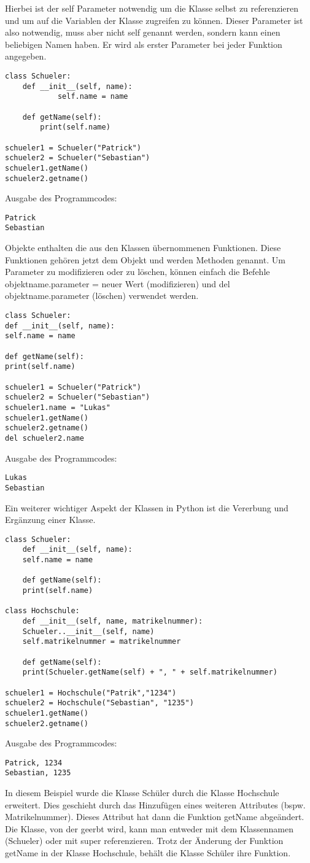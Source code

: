 Hierbei ist der self Parameter notwendig um die Klasse selbst zu referenzieren und um auf die Variablen der Klasse zugreifen zu k{\"o}nnen. Dieser Parameter ist also notwendig, muss aber nicht self genannt werden, sondern kann einen beliebigen Namen haben. Er wird als erster Parameter bei jeder Funktion angegeben.
\begin{lstlisting}
class Schueler:
	def __init__(self, name):
			self.name = name
	
	def getName(self):
		print(self.name)

schueler1 = Schueler("Patrick")
schueler2 = Schueler("Sebastian")
schueler1.getName()
schueler2.getname()
\end{lstlisting}
Ausgabe des Programmcodes: 
\begin{lstlisting}
Patrick
Sebastian
\end{lstlisting}
Objekte enthalten die aus den Klassen {\"u}bernommenen Funktionen. Diese Funktionen geh{\"o}ren jetzt dem Objekt und werden Methoden genannt.
Um Parameter zu modifizieren oder zu l{\"o}schen, k{\"o}nnen einfach die Befehle        objektname.parameter = neuer Wert (modifizieren) und del objektname.parameter (l{\"o}schen) verwendet werden.
\begin{lstlisting}
class Schueler:
def __init__(self, name):
self.name = name

def getName(self):
print(self.name)

schueler1 = Schueler("Patrick")
schueler2 = Schueler("Sebastian")
schueler1.name = "Lukas"
schueler1.getName()
schueler2.getname()
del schueler2.name
\end{lstlisting}
Ausgabe des Programmcodes: 
\begin{lstlisting}
Lukas
Sebastian
\end{lstlisting}
Ein weiterer wichtiger Aspekt der Klassen in Python ist die Vererbung und Erg{\"a}nzung einer Klasse.
\begin{lstlisting}
class Schueler:
	def __init__(self, name):
	self.name = name

	def getName(self):
	print(self.name)

class Hochschule:
	def __init__(self, name, matrikelnummer):
	Schueler..__init__(self, name)
	self.matrikelnummer = matrikelnummer
	
	def getName(self):
	print(Schueler.getName(self) + ", " + self.matrikelnummer)
	
schueler1 = Hochschule("Patrik","1234")
schueler2 = Hochschule("Sebastian", "1235")
schueler1.getName()
schueler2.getname()
\end{lstlisting}
Ausgabe des Programmcodes: 
\begin{lstlisting}
Patrick, 1234
Sebastian, 1235
\end{lstlisting}
In diesem Beispiel wurde die Klasse Sch{\"u}ler durch die Klasse Hochschule erweitert. Dies geschieht durch das Hinzuf{\"u}gen eines weiteren Attributes (bspw. Matrikelnummer). Dieses Attribut hat dann die Funktion getName abge{\"a}ndert. Die Klasse, von der geerbt wird, kann man entweder mit dem Klassennamen (Schueler) oder mit super referenzieren. Trotz der {\"A}nderung der Funktion getName in der Klasse Hochschule, beh{\"a}lt die Klasse Sch{\"u}ler ihre Funktion.

